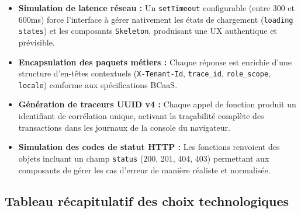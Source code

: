 \documentclass[12pt,a4paper]{report}
\begin{document}
\begin{itemize}[leftmargin=1.5cm, itemsep=5pt]
    \item \textbf{Simulation de latence réseau :} Un \texttt{setTimeout} configurable (entre 300 et 600ms) force l'interface à gérer nativement les états de chargement (\texttt{loading states}) et les composants \texttt{Skeleton}, produisant une UX authentique et prévisible.
    \item \textbf{Encapsulation des paquets métiers :} Chaque réponse est enrichie d'une structure d'en-têtes contextuels (\texttt{X-Tenant-Id}, \texttt{trace\_id}, \texttt{role\_scope}, \texttt{locale}) conforme aux spécifications BCaaS.
    \item \textbf{Génération de traceurs UUID v4 :} Chaque appel de fonction produit un identifiant de corrélation unique, activant la traçabilité complète des transactions dans les journaux de la console du navigateur.
    \item \textbf{Simulation des codes de statut HTTP :} Les fonctions renvoient des objets incluant un champ \texttt{status} (200, 201, 404, 403) permettant aux composants de gérer les cas d'erreur de manière réaliste et normalisée.
\end{itemize}

\subsection{Tableau récapitulatif des choix technologiques}
\end{document}
